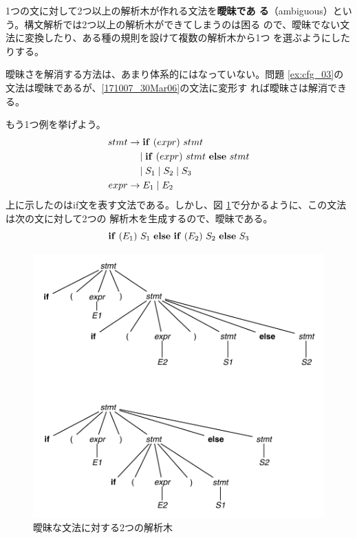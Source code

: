 1つの文に対して2つ以上の解析木が作れる文法を{\bfseries 曖昧であ
る}（ambiguous）という。構文解析では2つ以上の解析木ができてしまうのは困る
ので、曖昧でない文法に変換したり、ある種の規則を設けて複数の解析木から1つ
を選ぶようにしたりする。

曖昧さを解消する方法は、あまり体系的にはなっていない。問題
\ref{ex:cfg_03}の文法は曖昧であるが、\eqref{171007_30Mar06}の文法に変形す
れば曖昧さは解消できる。

もう1つ例を挙げよう。
\begin{align*}
 stmt & \rightarrow  {\bf if}\ (expr)\ stmt\  \\
      & \quad \mid {\bf if}\ (expr)\ stmt\ {\bf else}\ stmt \\
      & \quad \mid S_1 \mid S_2 \mid S_3 \\
 expr & \rightarrow  E_1 \mid E_2
\end{align*}
上に示したのはif文を表す文法である。しかし、図
\ref{fig:ambiguous_grammar}で分かるように、この文法は次の文に対して2つの
解析木を生成するので、曖昧である。
\[
 {\bf if}\ (E_1)\ S_1\ {\bf else}\ {\bf if}\ (E_2)\ S_2\ {\bf else}\ S_3
\]

\begin{figure}[]
 \begin{center}
  \includegraphics[scale=0.8]{figure/fig46.pdf}
 \end{center}
 \caption{曖昧な文法に対する2つの解析木}
 \label{fig:ambiguous_grammar}
\end{figure}

